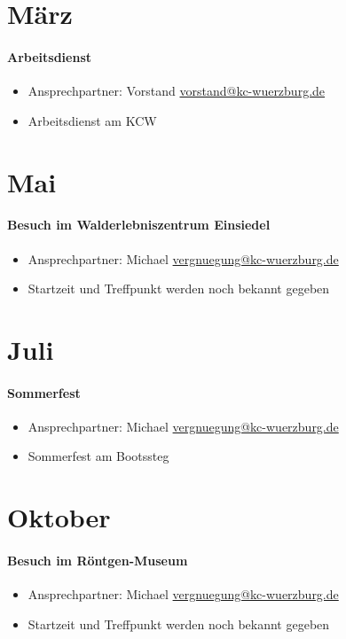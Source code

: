 \documentclass[12pt, a4paper]{report}
\begin{document}
\section*{März}\paragraph{Arbeitsdienst}
\begin{itemize}
    \item Ansprechpartner: Vorstand \href{mailto:vorstand@kc-wuerzburg.de}{vorstand@kc-wuerzburg.de}
    \item Arbeitsdienst am KCW
\end{itemize}

\section*{Mai}\paragraph{Besuch im Walderlebniszentrum Einsiedel}
\begin{itemize}
    \item Ansprechpartner: Michael \href{mailto:vergnuegung@kc-wuerzburg.de}{vergnuegung@kc-wuerzburg.de}
    \item Startzeit und Treffpunkt werden noch bekannt gegeben
\end{itemize}

\section*{Juli}\paragraph{Sommerfest}
\begin{itemize}
    \item Ansprechpartner: Michael \href{mailto:vergnuegung@kc-wuerzburg.de}{vergnuegung@kc-wuerzburg.de}
    \item Sommerfest am Bootssteg
\end{itemize}

\section*{Oktober}\paragraph{Besuch im Röntgen-Museum}
\begin{itemize}
    \item Ansprechpartner: Michael \href{mailto:vergnuegung@kc-wuerzburg.de}{vergnuegung@kc-wuerzburg.de}
    \item Startzeit und Treffpunkt werden noch bekannt gegeben
\end{itemize}
\end{document}
